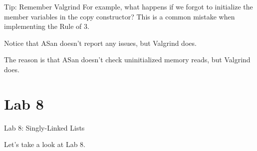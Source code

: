 \documentclass[14pt,aspectratio=1610, hyperref={pdfpagelayout=SinglePage}]{beamer}
\begin{document}
\begin{frame}{Tip: Remember Valgrind}
  For example, what happens if we forgot to initialize the member variables in the copy constructor? This is a common mistake when implementing the Rule of 3.

  Notice that ASan doesn't report any issues, but Valgrind does.
  
  The reason is that ASan doesn't check uninitialized memory reads, but Valgrind does.
\end{frame}

\section*{Lab 8}
\begin{frame}{Lab 8: Singly-Linked Lists}
\begin{center}\Large
Let's take a look at Lab 8.
\end{center}
\end{frame}
\end{document}
